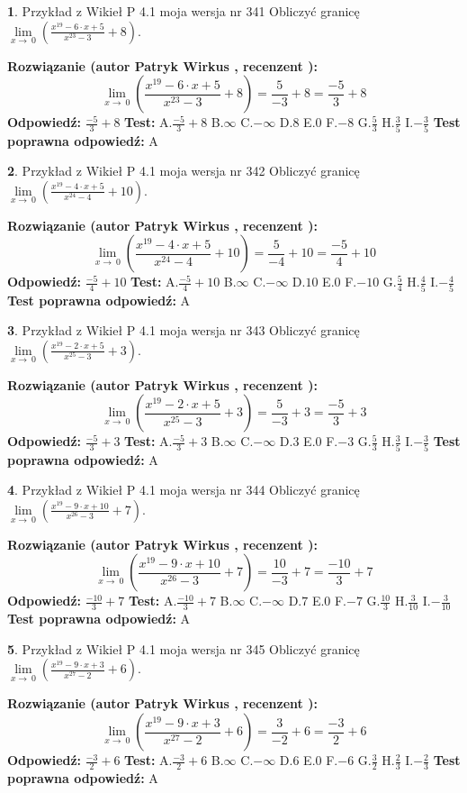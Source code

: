\documentclass[12pt, a4paper]{article}
\theoremstyle{definition} %
\newtheorem{zad}{}
\newcommand{\zadStart}[1]{\begin{zad}#1\newline}
\newcommand{\zadStop}{\end{zad}}
\newcommand{\rozwStart}[2]{\noindent \textbf{Rozwiązanie (autor #1 , recenzent #2): }\newline}
\newcommand{\rozwStop}{\newline}
\newcommand{\odpStart}{\noindent \textbf{Odpowiedź:}\newline}
\newcommand{\odpStop}{\newline}
\newcommand{\testStart}{\noindent \textbf{Test:}\newline}
\newcommand{\testStop}{\newline}
\newcommand{\kluczStart}{\noindent \textbf{Test poprawna odpowiedź:}\newline}
\newcommand{\kluczStop}{\newline}
\begin{document}
\zadStart{Przykład z Wikieł P 4.1 moja wersja nr 341}
Obliczyć granicę $\lim\limits_{x\to\ 0}(\frac{x^{19}-6 \cdot x +5}{x^{23}-3}+8)$.
\zadStop
\rozwStart{Patryk Wirkus}{}
$$\lim\limits_{x\to\ 0}(\frac{x^{19}-6 \cdot x +5}{x^{23}-3}+8)=\frac{5}{-3}+8=\frac{-5}{3}+8$$
\rozwStop
\odpStart
$\frac{-5}{3}+8$
\odpStop
\testStart
A.$\frac{-5}{3}+8$
B.$\infty$
C.$-\infty$
D.$8$
E.$0$
F.$-8$
G.$\frac{5}{3}$
H.$\frac{3}{5}$
I.$-\frac{3}{5}$
\testStop
\kluczStart
A
\kluczStop



\zadStart{Przykład z Wikieł P 4.1 moja wersja nr 342}
Obliczyć granicę $\lim\limits_{x\to\ 0}(\frac{x^{19}-4 \cdot x +5}{x^{24}-4}+10)$.
\zadStop
\rozwStart{Patryk Wirkus}{}
$$\lim\limits_{x\to\ 0}(\frac{x^{19}-4 \cdot x +5}{x^{24}-4}+10)=\frac{5}{-4}+10=\frac{-5}{4}+10$$
\rozwStop
\odpStart
$\frac{-5}{4}+10$
\odpStop
\testStart
A.$\frac{-5}{4}+10$
B.$\infty$
C.$-\infty$
D.$10$
E.$0$
F.$-10$
G.$\frac{5}{4}$
H.$\frac{4}{5}$
I.$-\frac{4}{5}$
\testStop
\kluczStart
A
\kluczStop



\zadStart{Przykład z Wikieł P 4.1 moja wersja nr 343}
Obliczyć granicę $\lim\limits_{x\to\ 0}(\frac{x^{19}-2 \cdot x +5}{x^{25}-3}+3)$.
\zadStop
\rozwStart{Patryk Wirkus}{}
$$\lim\limits_{x\to\ 0}(\frac{x^{19}-2 \cdot x +5}{x^{25}-3}+3)=\frac{5}{-3}+3=\frac{-5}{3}+3$$
\rozwStop
\odpStart
$\frac{-5}{3}+3$
\odpStop
\testStart
A.$\frac{-5}{3}+3$
B.$\infty$
C.$-\infty$
D.$3$
E.$0$
F.$-3$
G.$\frac{5}{3}$
H.$\frac{3}{5}$
I.$-\frac{3}{5}$
\testStop
\kluczStart
A
\kluczStop



\zadStart{Przykład z Wikieł P 4.1 moja wersja nr 344}
Obliczyć granicę $\lim\limits_{x\to\ 0}(\frac{x^{19}-9 \cdot x +10}{x^{26}-3}+7)$.
\zadStop
\rozwStart{Patryk Wirkus}{}
$$\lim\limits_{x\to\ 0}(\frac{x^{19}-9 \cdot x +10}{x^{26}-3}+7)=\frac{10}{-3}+7=\frac{-10}{3}+7$$
\rozwStop
\odpStart
$\frac{-10}{3}+7$
\odpStop
\testStart
A.$\frac{-10}{3}+7$
B.$\infty$
C.$-\infty$
D.$7$
E.$0$
F.$-7$
G.$\frac{10}{3}$
H.$\frac{3}{10}$
I.$-\frac{3}{10}$
\testStop
\kluczStart
A
\kluczStop



\zadStart{Przykład z Wikieł P 4.1 moja wersja nr 345}
Obliczyć granicę $\lim\limits_{x\to\ 0}(\frac{x^{19}-9 \cdot x +3}{x^{27}-2}+6)$.
\zadStop
\rozwStart{Patryk Wirkus}{}
$$\lim\limits_{x\to\ 0}(\frac{x^{19}-9 \cdot x +3}{x^{27}-2}+6)=\frac{3}{-2}+6=\frac{-3}{2}+6$$
\rozwStop
\odpStart
$\frac{-3}{2}+6$
\odpStop
\testStart
A.$\frac{-3}{2}+6$
B.$\infty$
C.$-\infty$
D.$6$
E.$0$
F.$-6$
G.$\frac{3}{2}$
H.$\frac{2}{3}$
I.$-\frac{2}{3}$
\testStop
\kluczStart
A
\kluczStop
\end{document}
